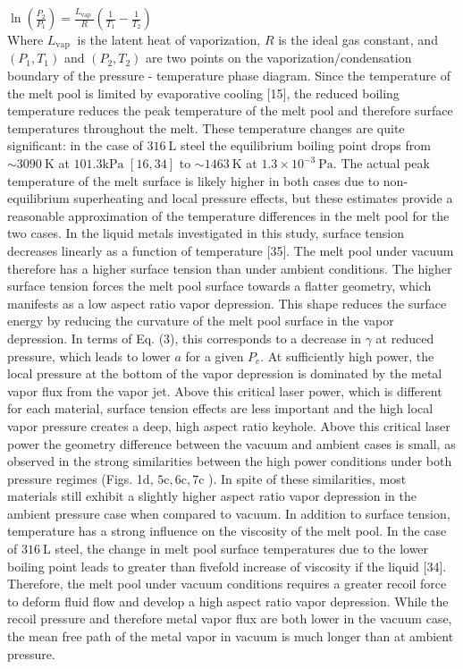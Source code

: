 \documentclass[10pt]{article}
\begin{document}
$\ln \left(\frac{P_{2}}{P_{1}}\right)=\frac{L_{\text {vap }}}{R}\left(\frac{1}{T_{1}}-\frac{1}{T_{2}}\right)$\\
Where $L_{\text {vap }}$ is the latent heat of vaporization, $R$ is the ideal gas constant, and $\left(P_{1}, T_{1}\right)$ and $\left(P_{2}, T_{2}\right)$ are two points on the vaporization/condensation boundary of the pressure - temperature phase diagram. Since the temperature of the melt pool is limited by evaporative cooling [15], the reduced boiling temperature reduces the peak temperature of the melt pool and therefore surface temperatures throughout the melt. These temperature changes are quite significant: in the case of $316 \mathrm{~L}$ steel the equilibrium boiling point drops from $\sim 3090 \mathrm{~K}$ at $101.3 \mathrm{kPa}$ $[16,34]$ to $\sim 1463 \mathrm{~K}$ at $1.3 \times 10^{-3} \mathrm{~Pa}$. The actual peak temperature of the melt surface is likely higher in both cases due to non-equilibrium superheating and local pressure effects, but these estimates provide a reasonable approximation of the temperature differences in the melt pool for the two cases. In the liquid metals investigated in this study, surface tension decreases linearly as a function of temperature [35]. The melt pool under vacuum therefore has a higher surface tension than under ambient conditions. The higher surface tension forces the melt pool surface towards a flatter geometry, which manifests as a low aspect ratio vapor depression. This shape reduces the surface energy by reducing the curvature of the melt pool surface in the vapor depression. In terms of Eq. (3), this corresponds to a decrease in $\gamma$ at reduced pressure, which leads to lower $a$ for a given $P_{c}$. At sufficiently high power, the local pressure at the bottom of the vapor depression is dominated by the metal vapor flux from the vapor jet. Above this critical laser power, which is different for each material, surface tension effects are less important and the high local vapor pressure creates a deep, high aspect ratio keyhole. Above this critical laser power the geometry difference between the vacuum and ambient cases is small, as observed in the strong similarities between the high power conditions under both pressure regimes (Figs. 1d, $5 \mathrm{c}, 6 \mathrm{c}, 7 \mathrm{c}$ ). In spite of these similarities, most materials still exhibit a slightly higher aspect ratio vapor depression in the ambient pressure case when compared to vacuum. In addition to surface tension, temperature has a strong influence on the viscosity of the melt pool. In the case of $316 \mathrm{~L}$ steel, the change in melt pool surface temperatures due to the lower boiling point leads to greater than fivefold increase of viscosity if the liquid [34]. Therefore, the melt pool under vacuum conditions requires a greater recoil force to deform fluid flow and develop a high aspect ratio vapor depression. While the recoil pressure and therefore metal vapor flux are both lower in the vacuum case, the mean free path of the metal vapor in vacuum is much longer than at ambient pressure.
\end{document}

